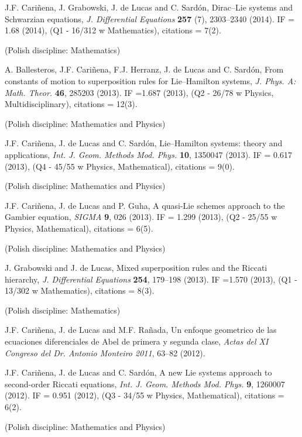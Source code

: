 \documentclass[12pt,reqno]{amsbook}
\begin{document}
\begin{enumerate}
{ \item  J.F. Cari\~nena, J. Grabowski, J. de Lucas and C. Sard\'on, \color{blue}Dirac--Lie systems and Schwarzian equations\color{black}, {\it J. Differential Equations} {\bf 257} (7), 2303--2340 (2014). IF = 1.68 (2014), (Q1 - 16/312 w Mathematics), citations = 7(2).} (Polish discipline: Mathematics)

{ \item  A. Ballesteros, J.F. Cari\~nena, F.J. Herranz, J. de Lucas and C. Sard\'on, \color{blue} From constants of motion to superposition rules for Lie--Hamilton systems\color{black}, {\it J. Phys. A: Math. Theor.} {\bf 46}, 285203 (2013). IF =1.687 (2013), (Q2 - 26/78 w Physics, Multidisciplinary), citations = 12(3).} (Polish discipline: Mathematics and Physics)

{ \item  J.F. Cari\~nena, J. de Lucas and C. Sard\'on, \color{blue} Lie--Hamilton systems: theory and applications\color{black}, {\it Int. J. Geom. Methods Mod. Phys.} {\bf 10}, 1350047  (2013). IF = 0.617 (2013), (Q4 - 45/55 w Physics, Mathematical), citations = 9(0).}
(Polish discipline: Mathematics and Physics)

{ \item  J.F. Cari\~nena, J. de Lucas and P. Guha, \color{blue}A quasi-Lie schemes approach to the Gambier equation\color{black}, {\it SIGMA} {\bf 9}, 026 (2013). IF = 1.299 (2013), (Q2 - 25/55 w Physics, Mathematical), citations = 6(5).} (Polish discipline: Mathematics and Physics)


{ \item  J. Grabowski and J. de Lucas, \color{blue}Mixed superposition rules and the Riccati hierarchy\color{black}, {\it J. Differential Equations} {\bf 254}, 179--198 (2013). IF =1.570 (2013), (Q1 - 13/302 w Mathematics), citations = 8(3).} (Polish discipline: Mathematics)

\item J.F. Cariñena, J. de Lucas and M.F. Rañada, \color{blue} Un enfoque geometrico de las ecuaciones diferenciales de Abel de primera y segunda clase,\color{black} {\it Actas del XI Congreso del Dr. Antonio Monteiro 2011}, 63--82 (2012).


{ \item J.F. Cari\~nena, J. de Lucas and C. Sard\'on, \color{blue}A new Lie systems approach to second-order Riccati equations\color{black}, {\it Int. J. Geom. Methods Mod. Phys.} {\bf  9}, 1260007 (2012).  IF = 0.951 (2012), (Q3 - 34/55 w Physics, Mathematical), citations = 6(2). }
(Polish discipline: Mathematics and Physics)


\end{enumerate}
\end{document}

